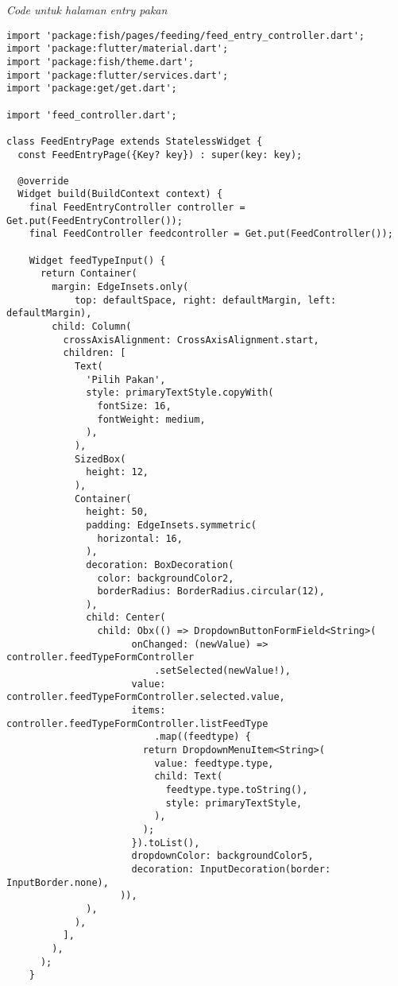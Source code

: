 	\textit{Code untuk halaman entry pakan}
	\begin{lstlisting}
import 'package:fish/pages/feeding/feed_entry_controller.dart';
import 'package:flutter/material.dart';
import 'package:fish/theme.dart';
import 'package:flutter/services.dart';
import 'package:get/get.dart';

import 'feed_controller.dart';

class FeedEntryPage extends StatelessWidget {
  const FeedEntryPage({Key? key}) : super(key: key);

  @override
  Widget build(BuildContext context) {
    final FeedEntryController controller = Get.put(FeedEntryController());
    final FeedController feedcontroller = Get.put(FeedController());

    Widget feedTypeInput() {
      return Container(
        margin: EdgeInsets.only(
            top: defaultSpace, right: defaultMargin, left: defaultMargin),
        child: Column(
          crossAxisAlignment: CrossAxisAlignment.start,
          children: [
            Text(
              'Pilih Pakan',
              style: primaryTextStyle.copyWith(
                fontSize: 16,
                fontWeight: medium,
              ),
            ),
            SizedBox(
              height: 12,
            ),
            Container(
              height: 50,
              padding: EdgeInsets.symmetric(
                horizontal: 16,
              ),
              decoration: BoxDecoration(
                color: backgroundColor2,
                borderRadius: BorderRadius.circular(12),
              ),
              child: Center(
                child: Obx(() => DropdownButtonFormField<String>(
                      onChanged: (newValue) => controller.feedTypeFormController
                          .setSelected(newValue!),
                      value: controller.feedTypeFormController.selected.value,
                      items: controller.feedTypeFormController.listFeedType
                          .map((feedtype) {
                        return DropdownMenuItem<String>(
                          value: feedtype.type,
                          child: Text(
                            feedtype.type.toString(),
                            style: primaryTextStyle,
                          ),
                        );
                      }).toList(),
                      dropdownColor: backgroundColor5,
                      decoration: InputDecoration(border: InputBorder.none),
                    )),
              ),
            ),
          ],
        ),
      );
    }


\end{lstlisting}
